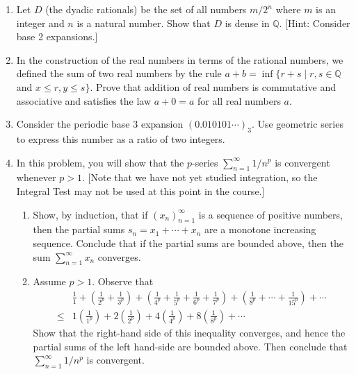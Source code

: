 \documentclass[hidelinks,12pt]{article}
\renewcommand{\geq}{\geqslant}
\renewcommand{\leq}{\leqslant}
\newcommand{\N}{\mathbb{N}}
\newcommand{\Z}{\mathbb{Z}}
\newcommand{\Q}{\mathbb{Q}}
\begin{document}
\begin{enumerate}
  \begin{proof}[Proof]
    Fix $a,b\in\Q$ with $a<b$. By definition we have $a=\frac{x}{y}$ for $x,y\in\Z$ and $y\neq0$ and $b=\frac{w}{z}$.Then consider $b-a=\frac{p}{q}$ for integers $p,q$ (by closure), then we have $b-a=\frac{p}{q}\geq\frac{1}{q}>\frac{1}{10^n}$ for some $n\in\N$. So there is some $n$ such that $\frac{1}{10^n}<b-a$. Then, let $X=\{\frac{k}{10^n}|k\in\Z,n\in\N\}$. Elements of $X$ are finite decimal expansions, and there is a largest $c\in X$ such that $c\leq a$. Then, simply add $c+\frac{1}{10^n}$ (Choose the $n$ you need). Then $a<c+\frac{1}{10^n}<b$.
  \end{proof}
\item Let $D$ (the dyadic rationals) be the set of all numbers $m / 2^n$ where $m$ is an integer and $n$ is a natural number. Show that $D$ is dense in $\mathbb{Q}$. [Hint: Consider base 2 expansions.]
\item In the construction of the real numbers in terms of the rational numbers, we defined the sum of two real numbers by the rule $a+b=\inf \{r+s \mid r, s \in \mathbb{Q}$ and $x \leq r, y \leq s\}$. Prove that addition of real numbers is commutative and associative and satisfies the law $a+0=a$ for all real numbers $a$.
\item Consider the periodic base 3 expansion $(0.010101 \cdots)_3$. Use geometric series to express this number as a ratio of two integers.
\item In this problem, you will show that the $p$-series $\sum_{n=1}^{\infty} 1 / n^p$ is convergent whenever $p>1$. [Note that we have not yet studied integration, so the Integral Test may not be used at this point in the course.]
  \begin{enumerate}
    \item Show, by induction, that if $\left(x_n\right)_{n=1}^{\infty}$ is a sequence of positive numbers, then the partial sums $s_n=x_1+\cdots+x_n$ are a monotone increasing sequence. Conclude that if the partial sums are bounded above, then the sum $\sum_{n=1}^{\infty} x_n$ converges.
    \item Assume $p>1$. Observe that\[
\begin{aligned}
&\frac{1}{1}+\left(\frac{1}{2^p}+\frac{1}{3^p}\right)+\left(\frac{1}{4^p}+\frac{1}{5^p}+\frac{1}{6^p}+\right. \left.\frac{1}{7^p}\right)+\left(\frac{1}{8^p}+\cdots+\frac{1}{15^p}\right)+\cdots \\
  \leq &1\left(\frac{1}{1^p}\right)+2\left(\frac{1}{2^p}\right)+4\left(\frac{1}{4^p}\right)+8\left(\frac{1}{8^p}\right)+\cdots
\end{aligned}\]
Show that the right-hand side of this inequality converges, and hence the partial sums of the left hand-side are bounded above. Then conclude that $\sum_{n=1}^{\infty} 1 / n^p$ is convergent.
  \end{enumerate}
\end{enumerate}
\end{document}
